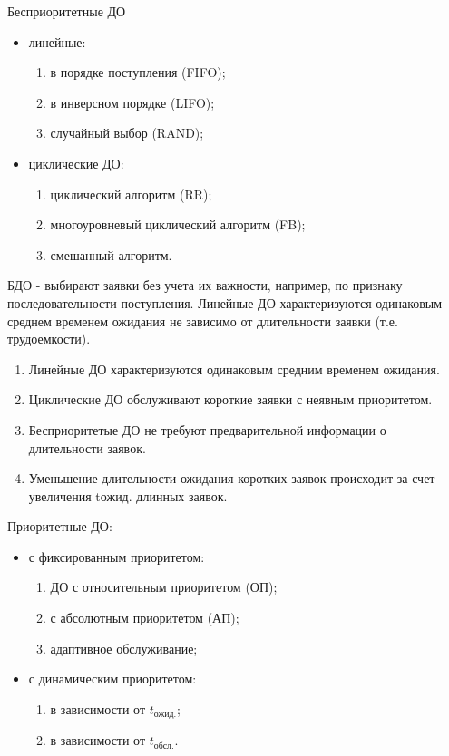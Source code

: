Бесприоритетные ДО
\begin{itemize}
  \item линейные:
  \begin{enumerate}
	  \item в порядке поступления (FIFO);
	  \item в инверсном порядке (LIFO);
	  \item случайный выбор (RAND);
  \end{enumerate}
  \item циклические ДО:
  \begin{enumerate}
	  \item циклический алгоритм (RR);
	  \item многоуровневый циклический алгоритм (FB);
	  \item смешанный алгоритм.
  \end{enumerate}
\end{itemize}
БДО - выбирают заявки без учета их важности, например, по признаку последовательности поступления.
Линейные ДО характеризуются одинаковым среднем временем ожидания не зависимо от длительности заявки (т.е. трудоемкости).
\begin{enumerate}
	\item Линейные ДО характеризуются одинаковым средним временем ожидания.
	\item Циклические ДО обслуживают короткие заявки с неявным приоритетом.
	\item Бесприоритетые ДО не требуют предварительной информации о длительности заявок.
	\item Уменьшение длительности ожидания коротких заявок происходит за счет увеличения tожид. длинных заявок.
\end{enumerate}

Приоритетные ДО:
\begin{itemize}
  \item с фиксированным приоритетом:
  \begin{enumerate}
	  \item ДО с относительным приоритетом (ОП);
	  \item с абсолютным приоритетом (АП);
	  \item адаптивное обслуживание;
  \end{enumerate}
  \item с динамическим приоритетом:
  \begin{enumerate}
	  \item в зависимости от $t_{\text{ожид.}}$;
	  \item в зависимости от $t_{\text{обсл.}}$.
  \end{enumerate}
\end{itemize}

